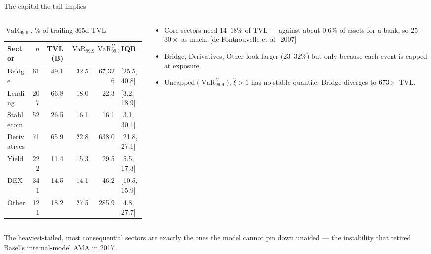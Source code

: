 \documentclass[10pt,xcolor=x11names,aspectratio=169]{beamer}
\newcommand{\VaR}{\operatorname{VaR}}
\newcommand{\src}[1]{[#1]}
\begin{document}
\begin{frame}{The capital the tail implies}
  \vskip -3mm
  \begin{columns}[T]
    \begin{column}{0.55\textwidth}
      \small\setlength{\tabcolsep}{3pt}
      $\VaR_{99.9}$, \% of trailing-365d TVL
      \begin{tabular}{l r r r r l}
        \toprule
        Sector & $n$ & TVL (B) & $\VaR_{99.9}$ & $\VaR^{U}_{99.9}$ & IQR \\
        \midrule
        Bridge      &  61 & 49.1 & 32.5 & 67{,}326 & [25.5,\,40.8] \\
        Lending     & 207 & 66.8 & 18.0 & 22.3 & [3.2,\,18.9] \\
        Stablecoin  &  52 & 26.5 & 16.1 & 16.1 & [3.1,\,30.1] \\
        Derivatives &  71 & 65.9 & 22.8 & 638.0 & [21.8,\,27.1] \\
        Yield       & 222 & 11.4 & 15.3 & 29.5 & [5.5,\,17.3] \\
        DEX         & 341 & 14.5 & 14.1 & 46.2 & [10.5,\,15.9] \\
        Other       & 121 & 18.2 & 27.5 & 285.9 & [4.8,\,27.7] \\
        \bottomrule
      \end{tabular}
    \end{column}
    \begin{column}{0.41\textwidth}
      \small
      \begin{itemize}
        \item Core sectors need $14$--$18\%$ of TVL --- against about
              $0.6\%$ of assets for a bank, so $25$--$30\times$ as much.
              \src{de Fontnouvelle et al.\ 2007}
        \item Bridge, Derivatives, Other look larger ($23$--$32\%$) but only
              because each event is capped at exposure.
        \item Uncapped ($\VaR^{U}_{99.9}$), $\hat\xi>1$ has no stable
              quantile: Bridge diverges to $673\times$ TVL.
      \end{itemize}
    \end{column}
  \end{columns}
  \begin{pitfall}
    The heaviest-tailed, most consequential sectors are exactly the ones the
    model cannot pin down unaided --- the instability that retired Basel's
    internal-model AMA in 2017.
  \end{pitfall}
\end{frame}
\end{document}
